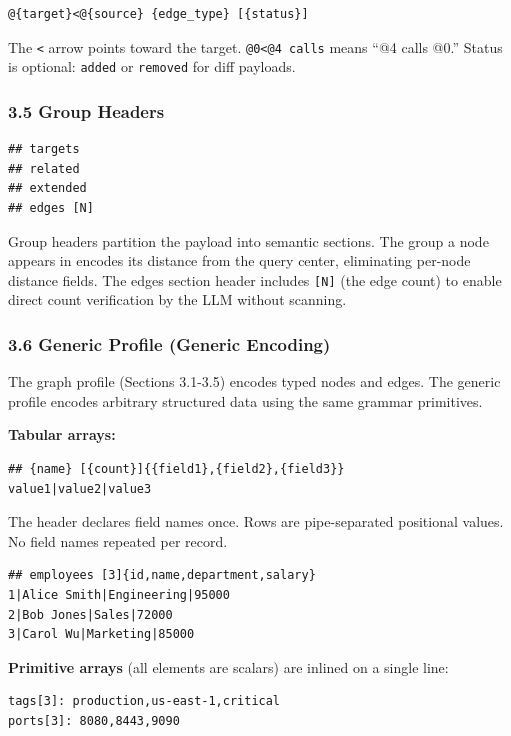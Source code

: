\documentclass[
  11pt,
  paper=a4,
  ,captions=tableheading
]{scrartcl}
\begin{document}
\begin{verbatim}
@{target}<@{source} {edge_type} [{status}]
\end{verbatim}

The \texttt{\textless{}} arrow points toward the target.
\texttt{@0\textless{}@4\ calls} means ``@4 calls @0.'' Status is
optional: \texttt{added} or \texttt{removed} for diff payloads.

\subsubsection{3.5 Group Headers}\label{group-headers}

\begin{verbatim}
## targets
## related
## extended
## edges [N]
\end{verbatim}

Group headers partition the payload into semantic sections. The group a
node appears in encodes its distance from the query center, eliminating
per-node distance fields. The edges section header includes
\texttt{{[}N{]}} (the edge count) to enable direct count verification by
the LLM without scanning.

\subsubsection{3.6 Generic Profile (Generic
Encoding)}\label{generic-profile-generic-encoding}

The graph profile (Sections 3.1-3.5) encodes typed nodes and edges. The
generic profile encodes arbitrary structured data using the same grammar
primitives.

\textbf{Tabular arrays:}

\begin{verbatim}
## {name} [{count}]{{field1},{field2},{field3}}
value1|value2|value3
\end{verbatim}

The header declares field names once. Rows are pipe-separated positional
values. No field names repeated per record.

\begin{verbatim}
## employees [3]{id,name,department,salary}
1|Alice Smith|Engineering|95000
2|Bob Jones|Sales|72000
3|Carol Wu|Marketing|85000
\end{verbatim}

\textbf{Primitive arrays} (all elements are scalars) are inlined on a
single line:

\begin{verbatim}
tags[3]: production,us-east-1,critical
ports[3]: 8080,8443,9090
\end{verbatim}
\end{document}
